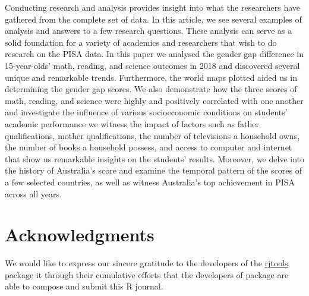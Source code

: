 Conducting research and analysis provides insight into what the
researchers have gathered from the complete set of data. In this
article, we see several examples of analysis and answers to a few
research questions. These analysis can serve as a solid foundation for a
variety of academics and researchers that wish to do research on the
PISA data. In this paper we analysed the gender gap difference in
15-year-olds' math, reading, and science outcomes in 2018 and discovered
several unique and remarkable trends. Furthermore, the world maps
plotted aided us in determining the gender gap scores. We also
demonstrate how the three scores of math, reading, and science were
highly and positively correlated with one another and investigate the
influence of various socioeconomic conditions on students' academic
performance we witness the impact of factors such as father
qualifications, mother qualifications, the number of televisions a
household owns, the number of books a household possess, and access to
computer and internet that show us remarkable insights on the students'
results. Moreover, we delve into the history of Australia's score and
examine the temporal pattern of the scores of a few selected countries,
as well as witness Australia's top achievement in PISA across all years.

\hypertarget{acknowledgments}{%
\section{Acknowledgments}\label{acknowledgments}}

We would like to express our sincere gratitude to the developers of the
\href{https://github.com/rjournal/rjtools}{rjtools} \citep{rjtools}
package it through their cumulative efforts that the developers of
 package are able to compose and submit this R
journal.



\address{%
Priya Ravindra Dingorkar\\
Monash University\\%
Department of Econometrics and Business Statistics\\ Clayton,
Australia\\
%
\url{https://www.linkedin.com/in/priya-dingorkar/}\\%
%
\href{mailto:priyadingorkar@gmail.com}{\nolinkurl{priyadingorkar@gmail.com}}%
}

\address{%
Kevin Y.X. Wang\\
University of Sydney\\%
School of Mathematics and Statistics\\ Sydney, Australia\\
%
\url{https://kevinwang09.github.io/}\\%
%
\href{mailto:kevinwangstats@gmail.com}{\nolinkurl{kevinwangstats@gmail.com}}%
}

\address{%
Dianne Cook\\
Monash University\\%
Department of Econometrics and Business Statistics\\ Clayton,
Australia\\
%
\url{http://dicook.org/}\\%
%
\href{mailto:dicook@monash.edu}{\nolinkurl{dicook@monash.edu}}%
}
